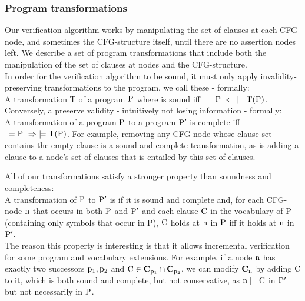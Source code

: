 \subsubsection*{Program transformations}
Our verification algorithm works by manipulating the set of clauses at each CFG-node, and sometimes the CFG-structure itself, until there are no assertion nodes left. 
We describe a set of program transformations that include both the manipulation of the set of clauses at nodes and the CFG-structure.\\
In order for the verification algorithm to be sound, it must only apply invalidity-preserving transformations to the program, we call these  - formally:\\
A transformation T of a program $\mathrm{P}$ where is sound iff $\mathrm{~\models P ~ \Leftarrow ~\models T(P)}$.\\
Conversely, a  preserve validity - intuitively not losing information - formally:\\
A transformation of a program $\mathrm{P}$ to a program $\mathrm{P'}$ is complete iff\\ $\mathrm{~\models P ~ \Rightarrow ~\models T(P)}$.
For example, removing any CFG-node whose clause-set contains the empty clause is a sound and complete transformation, as is adding a clause to a node's set of clauses that is entailed by this set of clauses.

\noindent
All of our transformations satisfy a stronger property than soundness and completeness:\\
A transformation of $\mathrm{P}$ to $\mathrm{P'}$ is  if it is sound and complete and, for each CFG-node $\mathrm{n}$ that occurs in both $\mathrm{P}$ and $\mathrm{P'}$ and each clause $\mathrm{C}$ in the vocabulary of P (containing only symbols that occur in P), $\mathrm{C}$ holds at $\mathrm{n}$ in $\mathrm{P}$ iff it holds at $\mathrm{n}$ in $\mathrm{P'}$.\\
The reason this property is interesting is that it allows incremental verification for some program and vocabulary extensions.
For example, if a node $\mathrm{n}$ has exactly two successors $\mathrm{p_1,p_2}$ and $\mathrm{C \in \mathbf{C}_{\mathrm{p_1}} \cap \mathbf{C}_{\mathrm{p_2}}}$, 
we can modify $\mathbf{C}_{\mathrm{n}}$ by adding $\mathrm{C}$ to it, which is both sound and complete, but not conservative, as $\mathrm{n \models C}$ in $\mathrm{P'}$ but not necessarily in $\mathrm{P}$.

